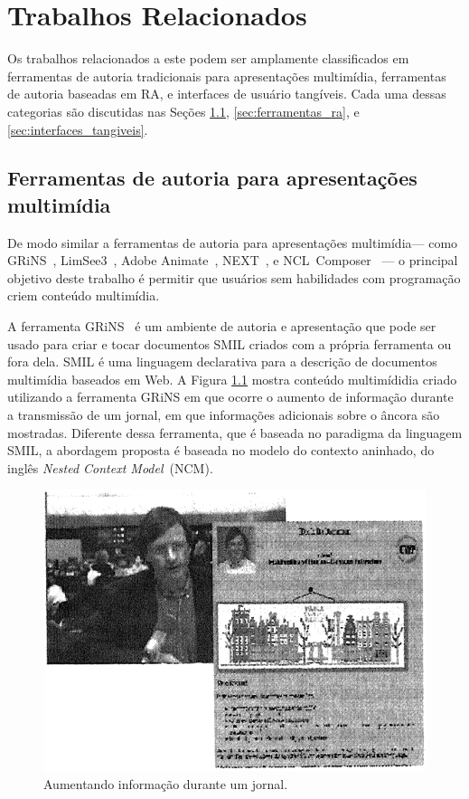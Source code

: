 \documentclass[../main.tex]{subfiles}
\begin{document}
\chapter{Trabalhos Relacionados}\label{cap:relacionados}

Os trabalhos relacionados a este podem ser amplamente classificados em ferramentas de autoria tradicionais para apresentações multimídia, ferramentas de autoria baseadas em RA, e interfaces de usuário tangíveis. Cada uma dessas categorias são discutidas nas Seções \ref{sec:ferramentas_multimidia}, \ref{sec:ferramentas_ra}, e \ref{sec:interfaces_tangiveis}.

\section{Ferramentas de autoria para apresentações multimídia}
\label{sec:ferramentas_multimidia}

De modo similar a ferramentas de autoria para apresentações multimídia--- como GRiNS~\cite{bulterman_grins_1998}, %
LimSee3~\cite{deltour_limsee3_2006}, %
Adobe Animate~\cite{adobe_animate_2017}, %
NEXT~\cite{paulo_de_mattos_next_2013}, %
e NCL~Composer~\cite{azevedo_composer_2014}%
--- o principal objetivo deste trabalho é permitir que usuários sem habilidades com programação criem conteúdo multimídia.

A ferramenta GRiNS~\cite{bulterman_grins_1998} é um ambiente de autoria e apresentação que pode ser usado para criar e tocar documentos SMIL\cite{rutledge2001smil} criados com a própria ferramenta ou fora dela. SMIL é uma linguagem declarativa para a descrição de documentos multimídia baseados em Web. A Figura \ref{fig:grins} mostra conteúdo multimídidia criado utilizando a ferramenta GRiNS em que ocorre o aumento de informação durante a transmissão de um jornal, em que informações adicionais sobre o âncora são mostradas. Diferente dessa ferramenta, que é baseada no paradigma da linguagem SMIL, a abordagem proposta é baseada no modelo do contexto aninhado, do inglês \emph{Nested Context Model}~(NCM)\cite{soares_nested_2005}.

\begin{figure}[!h]
\centering
\includegraphics[width=0.5\linewidth]{IMG/Relacionados/grins.png}
\caption{Aumentando informação durante um jornal.}
\label{fig:grins}
\end{figure}
\end{document}
